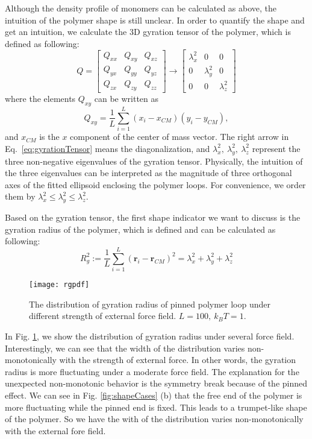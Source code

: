 Although the density profile of monomers can be calculated as above, the intuition of the polymer shape is still unclear. In order to quantify the shape and get an intuition, we calculate the 3D gyration tensor of the polymer, which is defined as following:
\begin{equation}
    \label{eq:gyrationTensor}
    Q = \begin{bmatrix}
    Q_{xx} & Q_{xy} & Q_{xz} \\
    Q_{yx} & Q_{yy} & Q_{yz} \\
    Q_{zx} & Q_{zy} & Q_{zz} 
    \end{bmatrix}
    \rightarrow \begin{bmatrix}
    \lambda_{x}^2 & 0 & 0 \\
    0 & \lambda_{y}^2 & 0 \\
    0 & 0 & \lambda_{z}^2 
\end{bmatrix}
\end{equation}
where the elements $Q_{xy}$ can be written as 
\begin{equation}
    \label{eq:gyrationTensorElement}
    Q_{xy} = \frac{1}{L}\sum_{i=1}^L{(x_i-x_{CM})(y_i-y_{CM})},
\end{equation}
and $x_{CM}$ is the $x$ component of the center of mass vector. The right arrow in Eq.~\eqref{eq:gyrationTensor} means the diagonalization, and $\lambda_x^2, ~\lambda_y^2, ~\lambda_z^2$ represent the three non-negative eigenvalues of the gyration tensor. Physically, the intuition of the three eigenvalues can be interpreted as the magnitude of three orthogonal axes of the fitted ellipsoid enclosing the polymer loops. For convenience, we order them by $\lambda_x^2\leq\lambda_y^2\leq\lambda_z^2$.

Based on the gyration tensor, the first shape indicator we want to discuss is the gyration radius of the polymer, which is defined and can be calculated as following:
\begin{equation}
    \label{eq:gyrationRadius}
    R_g^2 :=  \frac{1}{L} \sum_{i=1}^L \left(\mathbf{r}_i - \mathbf{r}_{CM}\right)^2 = \lambda_x^2 + \lambda_y^2 + \lambda_z^2
\end{equation}

\begin{figure}[htpb]
    \centering
    \texttt{[image: rgpdf]}
    \caption{The distribution of gyration radius of pinned polymer loop under different strength of external force field. $L=100, ~k_BT=1$. }
    \label{fig:rgpdf}
\end{figure}
In Fig. \ref{fig:rgpdf}, we show the distribution of gyration radius under several force field. Interestingly, we can see that the width of the distribution varies non-monotonically with the strength of external force. In other words, the gyration radius is more fluctuating under a moderate force field. 
The explanation for the unexpected non-monotonic behavior is the symmetry break because of the pinned effect. We can see in Fig. \ref{fig:shapeCases} (b) that the free end of the polymer is more fluctuating while the pinned end is fixed. This leads to a trumpet-like shape of the polymer. So we have the with of the distribution varies non-monotonically with the external fore field.

